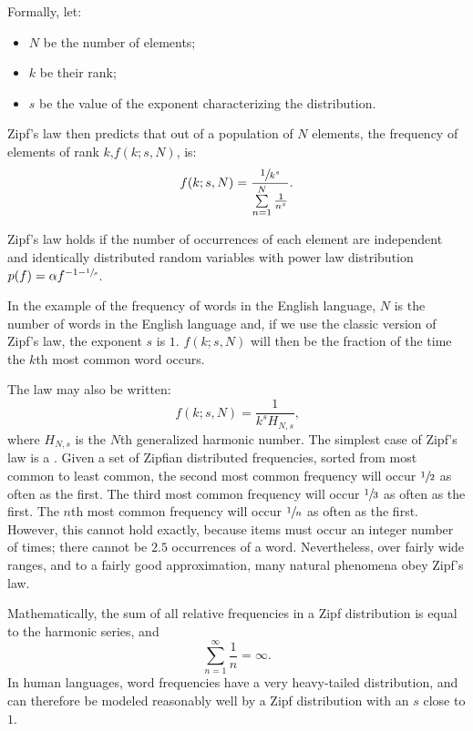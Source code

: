       Formally, let:
      \begin{itemize}
        \item $N$ be the number of elements;
        \item $k$ be their rank;
        \item $s$ be the value of the exponent characterizing the distribution.
      \end{itemize}
      Zipf's law then predicts that out of a population of $N$ elements, the frequency of elements of rank $k\mbox{,} f(k;s,N)$, is:
      \begin{equation}
        f(k;s,N)=\frac{\sfrac{1}{k^s}}{\sum\limits_{n=1}^N \frac{1}{n^s}}\mbox{.}
      \end{equation}

      Zipf's law holds if the number of occurrences of each element are independent and identically distributed random variables with power law distribution $p(f) = \alpha f^{-1-\sfrac{1}{s}}$.\cite{AdamicHuberman2002}

      In the example of the frequency of words in the English language, $N$ is the number of words in the English language and, if we use the classic version of Zipf's law, the exponent $s$ is $1$. $f(k; s,N)$ will then be the fraction of the time the $k$th most common word occurs.

      The law may also be written:
      \begin{equation}
        f(k;s,N)=\frac{1}{k^s H_{N,s}}\mbox{,}
      \end{equation}
      where $H_{N,s}$ is the $N$th generalized harmonic number.
The simplest case of Zipf's law is a . Given a set of Zipfian distributed frequencies, sorted from most common to least common, the second most common frequency will occur $\sfrac{1}{2}$ as often as the first. The third most common frequency will occur $\sfrac{1}{3}$ as often as the first. The $n$th most common frequency will occur $\sfrac{1}{n}$ as often as the first. However, this cannot hold exactly, because items must occur an integer number of times; there cannot be $2.5$ occurrences of a word. Nevertheless, over fairly wide ranges, and to a fairly good approximation, many natural phenomena obey Zipf's law.

      Mathematically, the sum of all relative frequencies in a Zipf distribution is equal to the harmonic series, and
      \begin{equation}
        \sum_{n=1}^\infty \frac{1}{n}=\infty\mbox{.}
      \end{equation}
      In human languages, word frequencies have a very heavy-tailed distribution, and can therefore be modeled reasonably well by a Zipf distribution with an $s$ close to $1$.

